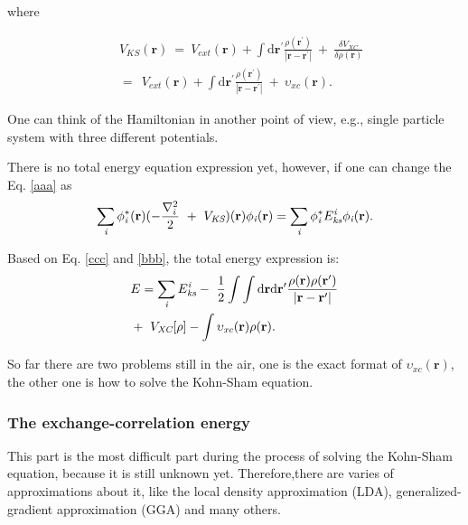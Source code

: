 \documentclass[a4paper, 12pt, titlepage,oneside,drop]{kthesis}
\begin{document}
where

\begin{equation}\begin{split}
&\ V_\textit{KS}(\textbf{r}) \ = \ V_\textit{ext}(\textbf{r}) + \int \mathrm{d}{\textbf{r}^{\prime}}  \frac{\rho(\textbf{r}^{\prime})}{|{\textbf{r}}-{\textbf{r}}^{\prime}|} \ + \ \frac{\delta{V_\textit{XC}}}{\delta{\rho(\textbf{r})}} \\
&\ = \ \ V_\textit{ext}(\textbf{r}) + \int \mathrm{d}{\textbf{r}^{\prime}}  \frac{\rho(\textbf{r}^{\prime})}{|{\textbf{r}}-{\textbf{r}}^{\prime}|} \ + \ \upsilon_\textit{xc}(\textbf{r}).
\end{split}
\end{equation}

One can think of the Hamiltonian in another point of view, e.g., single particle system with three different potentials. 

There is no total energy equation expression yet, however, if one can change the Eq. \ref{aaa} as 
\begin{equation}\label{bbb}
\sumi<i> \phi^{*}_{\textit{i}}(\textbf{r})(-\frac{\nabla^{2}_{i}}{2}\ + \ V_\textit{KS})(\textbf{r}) \phi_{\textit{i}}(\textbf{r}) = \sumi<i> \phi^{*}_{\textit{i}}E_{\textit{ks}}^{\textit{i}} \phi_{\textit{i}}(\textbf{r}).
\end{equation}

Based on Eq. \ref{ccc} and \ref{bbb}, the total energy expression is:
\begin{equation}\label{totalenergy}
\begin{split}
& E= \sumi<i> E_{\textit{ks}}^{\textit{i}} - \ \frac{1}{2} \int \int \mathrm{d} {\textbf{r}} \mathrm{d}{\textbf{r}^{\prime}} \frac{\rho({\textbf{r}})\rho(\textbf{r}^{\prime})}{|{\textbf{r}}-{\textbf{r}}^{\prime}|} \\
&    + \ V_\textit{XC}[\rho] - \int   \upsilon_\textit{xc}(\textbf{r}) \rho({\textbf{r}}).
\end{split}
\end{equation}

So far there are two problems still in the air, one is the exact format of $\upsilon_\textit{xc}(\textbf{r})$, the other one is how to solve the Kohn-Sham equation.

\subsubsection{The exchange-correlation energy}

This part is the most difficult part during the process of solving the Kohn-Sham equation, because it is still unknown yet. Therefore,there
 are varies of approximations about it, like the local density approximation (LDA), generalized-gradient approximation (GGA) and many others.
\end{document}
